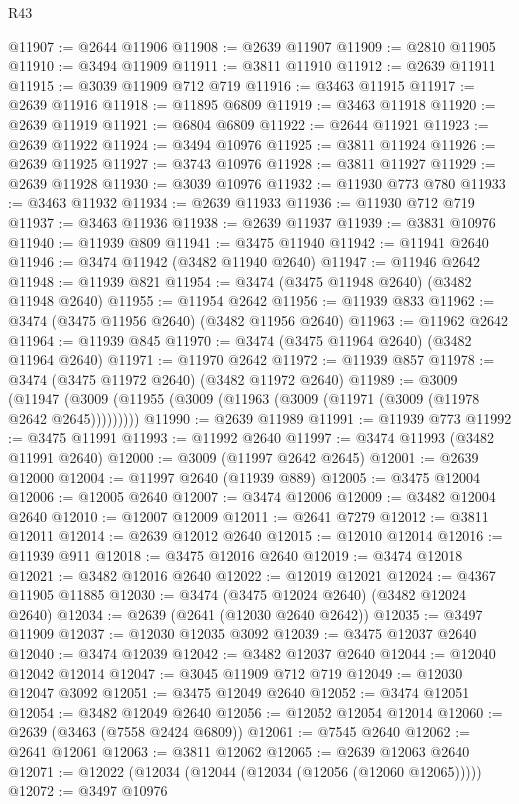 \begin{lexlean}{R43}
\begin{coremodule}
@11907 := @2644 @11906
@11908 := @2639 @11907
@11909 := @2810 @11905
@11910 := @3494 @11909
@11911 := @3811 @11910
@11912 := @2639 @11911
@11915 := @3039 @11909 @712 @719
@11916 := @3463 @11915
@11917 := @2639 @11916
@11918 := @11895 @6809
@11919 := @3463 @11918
@11920 := @2639 @11919
@11921 := @6804 @6809
@11922 := @2644 @11921
@11923 := @2639 @11922
@11924 := @3494 @10976
@11925 := @3811 @11924
@11926 := @2639 @11925
@11927 := @3743 @10976
@11928 := @3811 @11927
@11929 := @2639 @11928
@11930 := @3039 @10976
@11932 := @11930 @773 @780
@11933 := @3463 @11932
@11934 := @2639 @11933
@11936 := @11930 @712 @719
@11937 := @3463 @11936
@11938 := @2639 @11937
@11939 := @3831 @10976
@11940 := @11939 @809
@11941 := @3475 @11940
@11942 := @11941 @2640
@11946 := @3474 @11942 (@3482 @11940 @2640)
@11947 := @11946 @2642
@11948 := @11939 @821
@11954 := @3474 (@3475 @11948 @2640) (@3482 @11948 @2640)
@11955 := @11954 @2642
@11956 := @11939 @833
@11962 := @3474 (@3475 @11956 @2640) (@3482 @11956 @2640)
@11963 := @11962 @2642
@11964 := @11939 @845
@11970 := @3474 (@3475 @11964 @2640) (@3482 @11964 @2640)
@11971 := @11970 @2642
@11972 := @11939 @857
@11978 := @3474 (@3475 @11972 @2640) (@3482 @11972 @2640)
@11989 := @3009
    (@11947 (@3009 (@11955 (@3009 (@11963 (@3009 (@11971 (@3009 (@11978 @2642 @2645)))))))))
@11990 := @2639 @11989
@11991 := @11939 @773
@11992 := @3475 @11991
@11993 := @11992 @2640
@11997 := @3474 @11993 (@3482 @11991 @2640)
@12000 := @3009 (@11997 @2642 @2645)
@12001 := @2639 @12000
@12004 := @11997 @2640 (@11939 @889)
@12005 := @3475 @12004
@12006 := @12005 @2640
@12007 := @3474 @12006
@12009 := @3482 @12004 @2640
@12010 := @12007 @12009
@12011 := @2641 @7279
@12012 := @3811 @12011
@12014 := @2639 @12012 @2640
@12015 := @12010 @12014
@12016 := @11939 @911
@12018 := @3475 @12016 @2640
@12019 := @3474 @12018
@12021 := @3482 @12016 @2640
@12022 := @12019 @12021
@12024 := @4367 @11905 @11885
@12030 := @3474 (@3475 @12024 @2640) (@3482 @12024 @2640)
@12034 := @2639 (@2641 (@12030 @2640 @2642))
@12035 := @3497 @11909
@12037 := @12030 @12035 @3092
@12039 := @3475 @12037 @2640
@12040 := @3474 @12039
@12042 := @3482 @12037 @2640
@12044 := @12040 @12042 @12014
@12047 := @3045 @11909 @712 @719
@12049 := @12030 @12047 @3092
@12051 := @3475 @12049 @2640
@12052 := @3474 @12051
@12054 := @3482 @12049 @2640
@12056 := @12052 @12054 @12014
@12060 := @2639 (@3463 (@7558 @2424 @6809))
@12061 := @7545 @2640
@12062 := @2641 @12061
@12063 := @3811 @12062
@12065 := @2639 @12063 @2640
@12071 := @12022 (@12034 (@12044 (@12034 (@12056 (@12060 @12065)))))
@12072 := @3497 @10976

\end{coremodule}
\end{lexlean}
